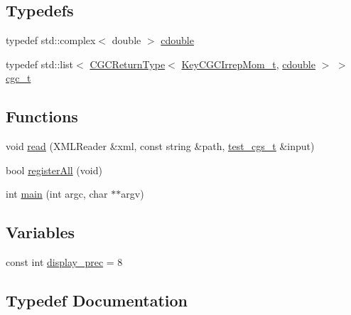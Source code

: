 \subsection*{Typedefs}
\begin{DoxyCompactItemize}
\item 
typedef std\+::complex$<$ double $>$ \mbox{\hyperlink{adat-devel_2main_2irreputils_2test__cgs_8cc_a5f9966666d076841002cd443622b7ccd}{cdouble}}
\item 
typedef std\+::list$<$ \mbox{\hyperlink{structHadron_1_1CGCReturnType}{C\+G\+C\+Return\+Type}}$<$ \mbox{\hyperlink{structHadron_1_1KeyCGCIrrepMom__t}{Key\+C\+G\+C\+Irrep\+Mom\+\_\+t}}, \mbox{\hyperlink{namespaceHadron_1_1CGC_a52d2b70e6792726fb525eab94daae53b}{cdouble}} $>$ $>$ \mbox{\hyperlink{adat-devel_2main_2irreputils_2test__cgs_8cc_a3c0cc566063b4e9f9351ef99884395b3}{cgc\+\_\+t}}
\end{DoxyCompactItemize}
\subsection*{Functions}
\begin{DoxyCompactItemize}
\item 
void \mbox{\hyperlink{adat-devel_2main_2irreputils_2test__cgs_8cc_a0bc6eab6ee4938b14f32a0a933d96dd9}{read}} (X\+M\+L\+Reader \&xml, const string \&path, \mbox{\hyperlink{structtest__cgs__t}{test\+\_\+cgs\+\_\+t}} \&input)
\item 
bool \mbox{\hyperlink{adat-devel_2main_2irreputils_2test__cgs_8cc_a3872416cf70cb24d7da1008a3f3b1d96}{register\+All}} (void)
\item 
int \mbox{\hyperlink{adat-devel_2main_2irreputils_2test__cgs_8cc_a3c04138a5bfe5d72780bb7e82a18e627}{main}} (int argc, char $\ast$$\ast$argv)
\end{DoxyCompactItemize}
\subsection*{Variables}
\begin{DoxyCompactItemize}
\item 
const int \mbox{\hyperlink{adat-devel_2main_2irreputils_2test__cgs_8cc_a473744fa8268c6d49feba30498a6cace}{display\+\_\+prec}} = 8
\end{DoxyCompactItemize}


\subsection{Typedef Documentation}
\mbox{\label{adat-devel_2main_2irreputils_2test__cgs_8cc_a5f9966666d076841002cd443622b7ccd}} 
